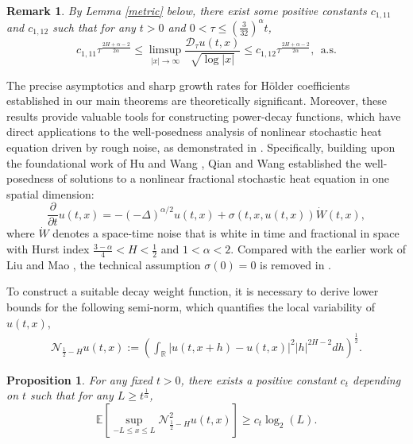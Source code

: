\documentclass[11pt,reqno]{amsart}
\numberwithin{equation}{section}
\newtheorem{proposition}[theorem]{Proposition}
\newtheorem{remark}{Remark}[section]
\def\RR{\mathbb{R}}
\newcommand{\1}{{\bf 1}}
\newcommand{\2}{{\bf 2}}
\begin{document}
\begin{remark}
By Lemma \ref{metric} below, there exist some positive constants $c_{1,11}$ and $c_{1,12}$ such that for any $t>0$ and $0<\tau\leq \left(\frac3{32}\right)^\alpha t$,
\begin{equation*}
c_{1,11}\tau^{\frac{2H+\alpha-2}{2\alpha}}\leq\limsup_{|x|\rightarrow\infty}\frac{\mathcal D_{\tau} u(t,x)}{\sqrt{\log |x|}}\leq c_{1,12}\tau^{\frac{2H+\alpha-2}{2\alpha}},\ \ \text{a.s.}
\end{equation*}
\end{remark}

The precise asymptotics and sharp growth rates for H\"older coefficients established in our main theorems are theoretically significant. Moreover, these results provide valuable tools for constructing power-decay functions, which have  direct applications to the well-posedness analysis of nonlinear  stochastic heat equation driven by rough noise, as demonstrated in \cite{HW2022}.  
Specifically, building upon the foundational work of Hu and Wang   \cite{HW2022}, Qian and Wang \cite{QW2025} established  the well-posedness of solutions to a nonlinear fractional stochastic heat equation in one spatial dimension:
\begin{equation}
\frac{\partial}{\partial t}u(t, x) = -(-\Delta)^{\alpha/2}u(t, x) + \sigma(t,x,u(t,x)) \dot{W}(t, x),
\end{equation}
where $\dot{W}$ denotes a space-time noise that is white in time and fractional in space with Hurst index $\frac{3-\alpha}{4} < H < \frac{1}{2}$ and  $1 < \alpha < 2$. Compared  with  the earlier  work of  Liu and Mao \cite{LM22}, the technical assumption $\sigma(0)=0$ is removed in \cite{QW2025}.

To construct  a suitable  decay weight function,  it is necessary  to derive lower bounds for the following semi-norm, which  quantifies the local variability of $u(t,x)$,
\begin{align}\label{eq norm}
\mathcal N_{\frac12-H}u(t,x):=\left(\int_{\RR}|u(t,x+h)-u(t,x)|^2 |h|^{2H-2}dh\right)^{\frac12}.
\end{align}



\begin{proposition} \label{E:sup:N} For any fixed $t>0$, there exists a positive constant $c_{t}$  depending on $t$ such that for any  $L\geq t^{\frac1\alpha}$,
\begin{equation}\label{E:sup:N:lower}
\mathbb E\left[\sup_{-L\leq x\leq L}\mathcal N^2_{\frac12-H}u(t,x)\right]\geq c_{t}\log_2(L).
\end{equation}
\end{proposition}
\end{document}

